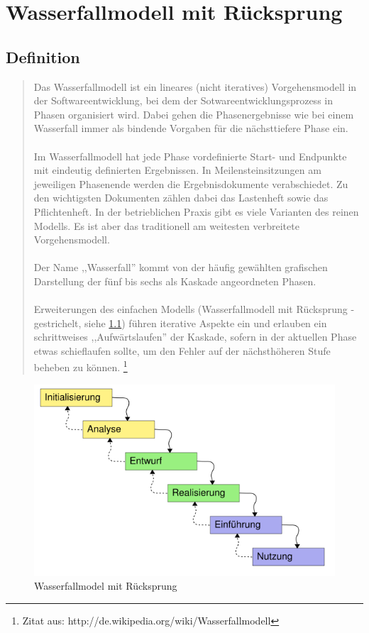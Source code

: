 \chapter{Wasserfallmodell mit Rücksprung}
\section{Definition}
\begin{quote}
Das Wasserfallmodell ist ein lineares (nicht iteratives) Vorgehensmodell in der Softwareentwicklung, bei dem der
 Sotwareentwicklungsprozess in Phasen organisiert wird. Dabei gehen die Phasenergebnisse wie bei einem Wasserfall immer
als bindende Vorgaben für die nächsttiefere Phase ein.\ \\ \\
Im Wasserfallmodell hat jede Phase vordefinierte Start- und Endpunkte mit eindeutig definierten Ergebnissen.
In Meilensteinsitzungen am jeweiligen Phasenende werden die Ergebnisdokumente verabschiedet. Zu den wichtigsten
Dokumenten zählen dabei das Lastenheft sowie das Pflichtenheft. In der betrieblichen Praxis gibt es viele Varianten
des reinen Modells. Es ist aber das traditionell am weitesten verbreitete Vorgehensmodell.\ \\ \\
Der Name ,,Wasserfall'' kommt von der häufig gewählten grafischen Darstellung der fünf bis sechs als Kaskade
angeordneten Phasen. \\ \\
Erweiterungen des einfachen Modells (Wasserfallmodell mit Rücksprung - gestrichelt, siehe \ref{w_model}) führen iterative Aspekte ein und erlauben
ein schrittweises ,,Aufwärtslaufen'' der Kaskade, sofern in der aktuellen Phase etwas schieflaufen sollte,
um den Fehler auf der nächsthöheren Stufe beheben zu können.
\footnote{Zitat aus:  http://de.wikipedia.org/wiki/Wasserfallmodell}
\end{quote}
\begin{figure}[h]
\centering
\includegraphics[width=\textwidth]{./gfx/misc/567px-Wasserfallmodell.png}
\caption{Wasserfallmodel mit Rücksprung}
\label{w_model}
\end{figure}
\newpage


